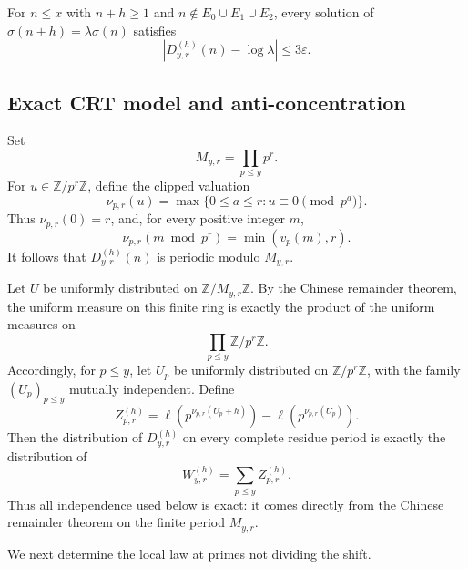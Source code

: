 \documentclass[11pt,reqno]{amsart}
\numberwithin{equation}{section}
\theoremstyle{plain}
\theoremstyle{definition}
\theoremstyle{remark}
\newcommand{\Z}{\mathbb Z}
\begin{document}
For $n\le x$ with $n+h\ge1$ and
$n\notin E_0\cup E_1\cup E_2$, every solution of
$\sigma(n+h)=\lambda\sigma(n)$ satisfies
\begin{equation}\label{eq:truncated-window}
\left|D^{(h)}_{y,r}(n)-\log\lambda\right|\le3\varepsilon.
\end{equation}

\subsection{Exact CRT model and anti-concentration}

Set
\[
M_{y,r}=\prod_{p\le y}p^r.
\]
For $u\in\Z/p^r\Z$, define the clipped valuation
\[
\nu_{p,r}(u)=\max\{0\le a\le r:u\equiv0\pmod{p^a}\}.
\]
Thus $\nu_{p,r}(0)=r$, and, for every positive integer $m$,
\[
\nu_{p,r}(m\bmod p^r)=\min(v_p(m),r).
\]
It follows that $D^{(h)}_{y,r}(n)$ is periodic modulo $M_{y,r}$.

Let $U$ be uniformly distributed on $\Z/M_{y,r}\Z$. By the Chinese remainder theorem, the uniform measure on this finite ring is exactly the product of the uniform measures on
\[
\prod_{p\le y}\Z/p^r\Z.
\]
Accordingly, for $p\le y$, let $U_p$ be uniformly distributed on $\Z/p^r\Z$, with the family $(U_p)_{p\le y}$ mutually independent. Define
\[
Z^{(h)}_{p,r}
=
\ell\!\left(p^{\nu_{p,r}(U_p+h)}\right)
-
\ell\!\left(p^{\nu_{p,r}(U_p)}\right).
\]
Then the distribution of $D^{(h)}_{y,r}$ on every complete residue period is exactly the distribution of
\begin{equation}\label{eq:W-model}
W^{(h)}_{y,r}=\sum_{p\le y}Z^{(h)}_{p,r}.
\end{equation}
Thus all independence used below is exact: it comes directly from the Chinese remainder theorem on the finite period $M_{y,r}$.

We next determine the local law at primes not dividing the shift.
\end{document}
